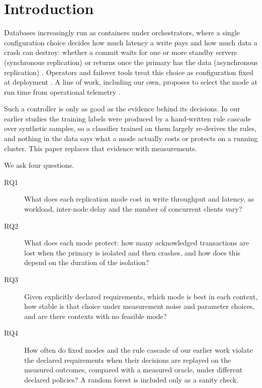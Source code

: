 \documentclass[smallextended]{svjour3}
\begin{document}
\section{Introduction}\label{sec:intro}
Databases increasingly run as containers under orchestrators, where a single configuration choice decides how much latency a write pays and how much data a crash can destroy: whether a commit waits for one or more standby servers (synchronous replication) or returns once the primary has the data (asynchronous replication) \cite{pgdocs,abadi2012}. Operators and failover tools treat this choice as configuration fixed at deployment \cite{cnpg,patroni,repmgr,stolon}. A line of work, including our own, proposes to select the mode at run time from operational telemetry \cite{jerrari2026iaha}.

Such a controller is only as good as the evidence behind its decisions. In our earlier studies \cite{jerrari2026iaha,jerrari2026cross} the training labels were produced by a hand-written rule cascade over synthetic samples, so a classifier trained on them largely re-derives the rules, and nothing in the data says what a mode actually costs or protects on a running cluster. This paper replaces that evidence with measurements.

We ask four questions.
\begin{description}
\item[RQ1] What does each replication mode cost in write throughput and latency, as workload, inter-node delay and the number of concurrent clients vary?
\item[RQ2] What does each mode protect: how many acknowledged transactions are lost when the primary is isolated and then crashes, and how does this depend on the duration of the isolation?
\item[RQ3] Given explicitly declared requirements, which mode is best in each context, how stable is that choice under measurement noise and parameter choices, and are there contexts with no feasible mode?
\item[RQ4] How often do fixed modes and the rule cascade of our earlier work violate the declared requirements when their decisions are replayed on the measured outcomes, compared with a measured oracle, under different declared policies? A random forest is included only as a sanity check.
\end{description}
\end{document}
